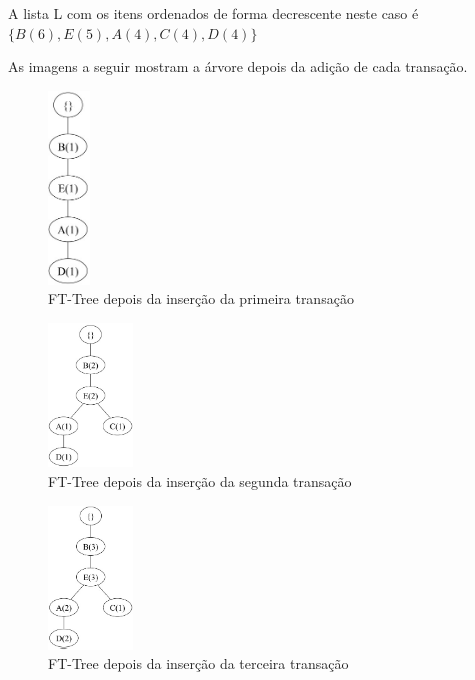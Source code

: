 \documentclass[12pt]{article}
\begin{document}
A lista L com os itens ordenados de forma decrescente neste caso é $\{B(6),E(5),A(4),C(4),D(4)\}$

As imagens a seguir mostram a árvore depois da adição de cada transação.

\begin{figure}[H]
    \centering
    \includegraphics[width=0.1\textwidth]{t1.jpg}
    \caption{FT-Tree depois da inserção da primeira transação}
    \label{fig:apriori}
\end{figure}


\begin{figure}[H]
    \centering
    \includegraphics[width=0.2\textwidth]{t2.jpg}
    \caption{FT-Tree depois da inserção da segunda transação}
    \label{fig:apriori}
\end{figure}

\begin{figure}[H]
    \centering
    \includegraphics[width=0.2\textwidth]{t3.jpg}
    \caption{FT-Tree depois da inserção da terceira transação}
    \label{fig:apriori}
\end{figure}
\end{document}

